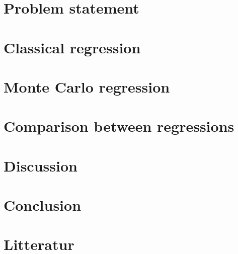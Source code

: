 \documentclass{article}
\begin{document}
	\section{Problem statement}
	\newpage
	\section{Classical regression}
 	
	\newpage
	\section{Monte Carlo regression}
	\newpage
	\section{Comparison between regressions}
	\newpage
	\section{Discussion}
	\newpage
	\section{Conclusion}
	\newpage
 	\section{Litteratur}
  
\end{document}
